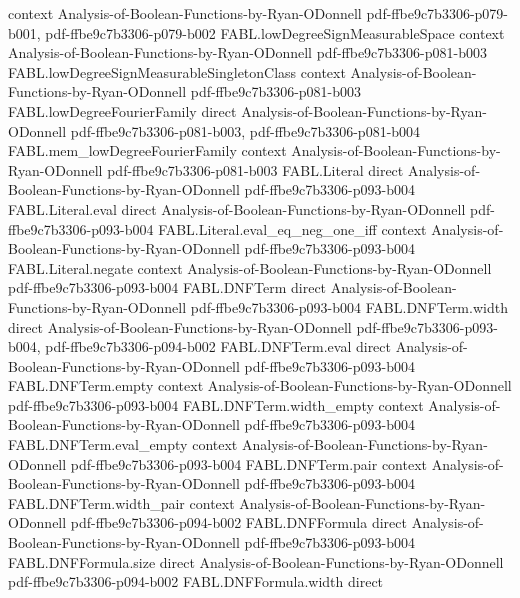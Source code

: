 \begin{theorem}
  {context}
  {Analysis-of-Boolean-Functions-by-Ryan-ODonnell}
  {pdf-ffbe9c7b3306-p079-b001,
    pdf-ffbe9c7b3306-p079-b002}
\proofstep
  {FABL.lowDegreeSignMeasurableSpace}
  {context}
  {Analysis-of-Boolean-Functions-by-Ryan-ODonnell}
  {pdf-ffbe9c7b3306-p081-b003}
\proofstep
  {FABL.lowDegreeSignMeasurableSingletonClass}
  {context}
  {Analysis-of-Boolean-Functions-by-Ryan-ODonnell}
  {pdf-ffbe9c7b3306-p081-b003}
\proofstep
  {FABL.lowDegreeFourierFamily}
  {direct}
  {Analysis-of-Boolean-Functions-by-Ryan-ODonnell}
  {pdf-ffbe9c7b3306-p081-b003,
    pdf-ffbe9c7b3306-p081-b004}
\proofstep
  {FABL.mem_lowDegreeFourierFamily}
  {context}
  {Analysis-of-Boolean-Functions-by-Ryan-ODonnell}
  {pdf-ffbe9c7b3306-p081-b003}
\proofstep
  {FABL.Literal}
  {direct}
  {Analysis-of-Boolean-Functions-by-Ryan-ODonnell}
  {pdf-ffbe9c7b3306-p093-b004}
\proofstep
  {FABL.Literal.eval}
  {direct}
  {Analysis-of-Boolean-Functions-by-Ryan-ODonnell}
  {pdf-ffbe9c7b3306-p093-b004}
\proofstep
  {FABL.Literal.eval_eq_neg_one_iff}
  {context}
  {Analysis-of-Boolean-Functions-by-Ryan-ODonnell}
  {pdf-ffbe9c7b3306-p093-b004}
\proofstep
  {FABL.Literal.negate}
  {context}
  {Analysis-of-Boolean-Functions-by-Ryan-ODonnell}
  {pdf-ffbe9c7b3306-p093-b004}
\proofstep
  {FABL.DNFTerm}
  {direct}
  {Analysis-of-Boolean-Functions-by-Ryan-ODonnell}
  {pdf-ffbe9c7b3306-p093-b004}
\proofstep
  {FABL.DNFTerm.width}
  {direct}
  {Analysis-of-Boolean-Functions-by-Ryan-ODonnell}
  {pdf-ffbe9c7b3306-p093-b004,
    pdf-ffbe9c7b3306-p094-b002}
\proofstep
  {FABL.DNFTerm.eval}
  {direct}
  {Analysis-of-Boolean-Functions-by-Ryan-ODonnell}
  {pdf-ffbe9c7b3306-p093-b004}
\proofstep
  {FABL.DNFTerm.empty}
  {context}
  {Analysis-of-Boolean-Functions-by-Ryan-ODonnell}
  {pdf-ffbe9c7b3306-p093-b004}
\proofstep
  {FABL.DNFTerm.width_empty}
  {context}
  {Analysis-of-Boolean-Functions-by-Ryan-ODonnell}
  {pdf-ffbe9c7b3306-p093-b004}
\proofstep
  {FABL.DNFTerm.eval_empty}
  {context}
  {Analysis-of-Boolean-Functions-by-Ryan-ODonnell}
  {pdf-ffbe9c7b3306-p093-b004}
\proofstep
  {FABL.DNFTerm.pair}
  {context}
  {Analysis-of-Boolean-Functions-by-Ryan-ODonnell}
  {pdf-ffbe9c7b3306-p093-b004}
\proofstep
  {FABL.DNFTerm.width_pair}
  {context}
  {Analysis-of-Boolean-Functions-by-Ryan-ODonnell}
  {pdf-ffbe9c7b3306-p094-b002}
\proofstep
  {FABL.DNFFormula}
  {direct}
  {Analysis-of-Boolean-Functions-by-Ryan-ODonnell}
  {pdf-ffbe9c7b3306-p093-b004}
\proofstep
  {FABL.DNFFormula.size}
  {direct}
  {Analysis-of-Boolean-Functions-by-Ryan-ODonnell}
  {pdf-ffbe9c7b3306-p094-b002}
\proofstep
  {FABL.DNFFormula.width}
  {direct}

\end{theorem}
